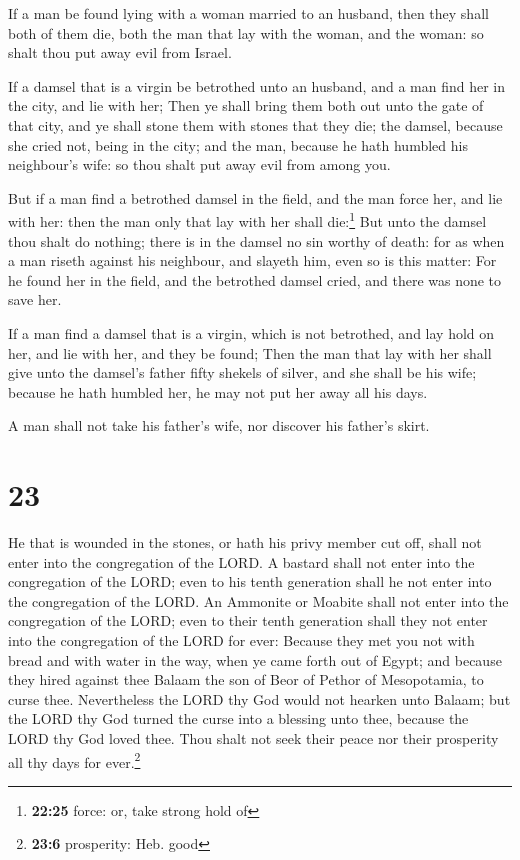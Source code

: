  If a man be found lying with a woman married to an
husband, then they shall both of them die, both the man that lay with
the woman, and the woman: so shalt thou put away evil from Israel.

 If a damsel that is a virgin be betrothed unto an
husband, and a man find her in the city, and lie with her;
 Then ye shall bring them both out unto the gate of that
city, and ye shall stone them with stones that they die; the damsel,
because she cried not, being in the city; and the man, because he hath
humbled his neighbour's wife: so thou shalt put away evil from among
you.

 But if a man find a betrothed damsel in the field, and
the man force her, and lie with her: then the man only that lay with her
shall die:\footnote{\textbf{22:25} force: or, take strong hold of}
 But unto the damsel thou shalt do nothing; there is in
the damsel no sin worthy of death: for as when a man riseth against his
neighbour, and slayeth him, even so is this matter:  For
he found her in the field, and the betrothed damsel cried, and there was
none to save her.

 If a man find a damsel that is a virgin, which is not
betrothed, and lay hold on her, and lie with her, and they be found;
 Then the man that lay with her shall give unto the
damsel's father fifty shekels of silver, and she shall be his wife;
because he hath humbled her, he may not put her away all his days.

 A man shall not take his father's wife, nor discover his
father's skirt.

\hypertarget{section-22}{%
\section{23}\label{section-22}}

 He that is wounded in the stones, or hath his privy
member cut off, shall not enter into the congregation of the LORD.
 A bastard shall not enter into the congregation of the
LORD; even to his tenth generation shall he not enter into the
congregation of the LORD.  An Ammonite or Moabite shall
not enter into the congregation of the LORD; even to their tenth
generation shall they not enter into the congregation of the LORD for
ever:  Because they met you not with bread and with water
in the way, when ye came forth out of Egypt; and because they hired
against thee Balaam the son of Beor of Pethor of Mesopotamia, to curse
thee.  Nevertheless the LORD thy God would not hearken
unto Balaam; but the LORD thy God turned the curse into a blessing unto
thee, because the LORD thy God loved thee.  Thou shalt not
seek their peace nor their prosperity all thy days for ever.\footnote{\textbf{23:6}
  prosperity: Heb. good}


